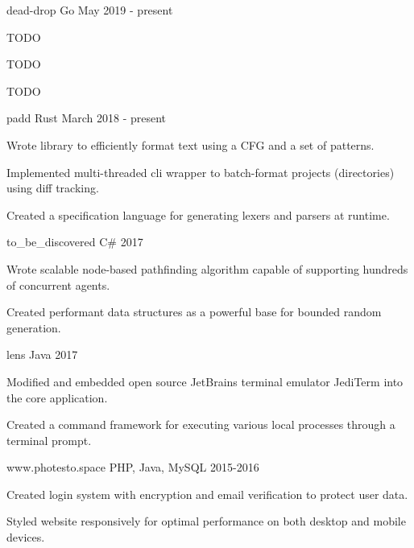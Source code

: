 
\begin{cventries}
  
   {dead-drop} {Go} {May 2019
    - present} {
    \begin{cvitems}
    \item TODO
    \item TODO
    \item TODO
    \end{cvitems}
  }
  
   {padd}
  {Rust} {March 2018 - present} {
    \begin{cvitems}
    \item Wrote library to efficiently format text using a CFG and a set of
      patterns.
    \item Implemented multi-threaded cli wrapper to batch-format projects
      (directories) using diff tracking.
    \item Created a specification language for generating lexers and parsers at
      runtime.
    \end{cvitems}
  }
  
  {to\_be\_discovered} {C\#} {2017} {
    \begin{cvitems}
    \item Wrote scalable node-based pathfinding algorithm capable of supporting
      hundreds of concurrent agents.
    \item Created performant data structures as a powerful base for bounded
      random generation.
    \end{cvitems}
  }
  
   {lens} {Java}
  {2017} {
    \begin{cvitems}
    \item Modified and embedded open source JetBrains terminal emulator JediTerm
      into the core application.
    \item Created a command framework for executing various local processes
      through a terminal prompt.
    \end{cvitems}
  }
  
   {www.photesto.space} {PHP,
    Java, MySQL} {2015-2016} {
    \begin{cvitems}
    \item Created login system with encryption and email verification to protect
      user data.
    \item Styled website responsively for optimal performance on both desktop
      and mobile devices.
    \end{cvitems}
  }
  

\end{cventries}
